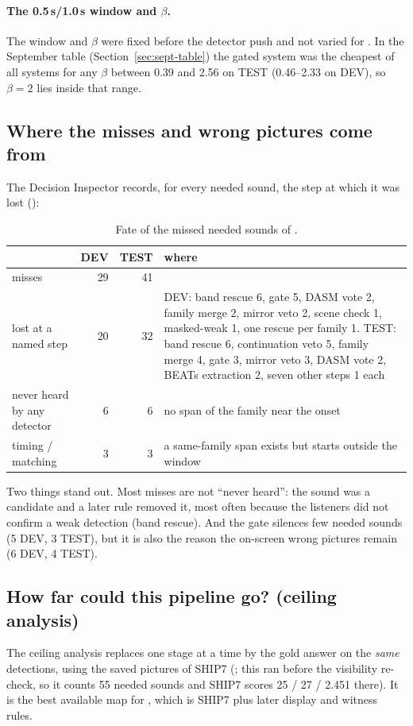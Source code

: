\paragraph{The 0.5\,s/1.0\,s window and $\beta$.} The window and $\beta$ were fixed before the detector push and not
varied for \Dp. In the September table (Section~\ref{sec:sept-table}) the gated system was the cheapest of all systems
for any $\beta$ between 0.39 and 2.56 on TEST (0.46--2.33 on DEV), so $\beta = 2$ lies inside that range.

\subsection{Where the misses and wrong pictures come from}\label{sec:errors}
The Decision Inspector records, for every needed sound, the step at which it was lost
():

\begin{table}[h]
\centering\small
\caption{Fate of the missed needed sounds of \Dp.}
\label{tab:misses}
\begin{tabular}{L{4.0cm}rrL{8.4cm}}
\toprule
 & DEV & TEST & where \\
\midrule
misses & 29 & 41 & \\
\quad lost at a named step & 20 & 32 & DEV: band rescue 6, gate 5, DASM vote 2, family merge 2, mirror veto 2, scene check 1, masked-weak 1, one rescue per family 1. TEST: band rescue 6, continuation veto 5, family merge 4, gate 3, mirror veto 3, DASM vote 2, BEATs extraction 2, seven other steps 1 each \\
\quad never heard by any detector & 6 & 6 & no span of the family near the onset \\
\quad timing / matching & 3 & 3 & a same-family span exists but starts outside the window \\
\bottomrule
\end{tabular}
\end{table}

Two things stand out. Most misses are not ``never heard'': the sound was a candidate and a later rule removed it,
most often because the listeners did not confirm a weak detection (band rescue). And the gate silences few needed
sounds (5 DEV, 3 TEST), but it is also the reason the on-screen wrong pictures remain (6 DEV, 4 TEST).

\subsection{How far could this pipeline go? (ceiling analysis)}\label{sec:ceiling}
The ceiling analysis replaces one stage at a time by the gold answer on the \emph{same} detections, using the saved
pictures of SHIP7 (; this ran before the visibility re-check, so it counts 55
needed sounds and SHIP7 scores 25 / 27 / 2.451 there). It is the best available map for \Dp, which is SHIP7 plus later
display and witness rules.

